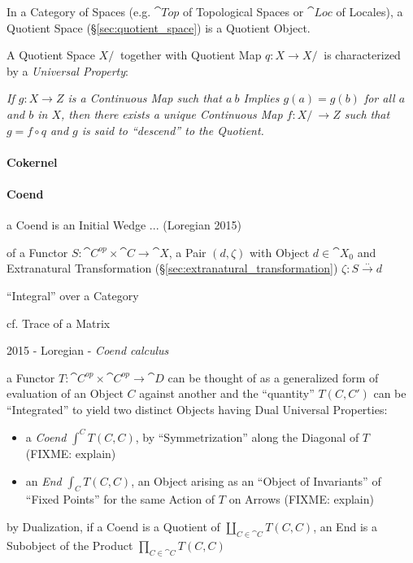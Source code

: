 In a Category of Spaces (e.g. $\cat{Top}$ of Topological Spaces or $\cat{Loc}$
of Locales), a Quotient Space (\S\ref{sec:quotient_space}) is a Quotient
Object.

A Quotient Space $X/~$ together with Quotient Map $q : X \rightarrow X/~$ is
characterized by a \emph{Universal Property}:

\emph{If $g : X \rightarrow Z$ is a Continuous Map such that $a ~ b$ Implies $g(a)
  = g(b)$ for all $a$ and $b$ in $X$, then there exists a unique Continuous Map
  $f : X/~ \rightarrow Z$ such that $g = f \circ q$ and $g$ is said to
  ``descend'' to the Quotient.}



\paragraph{Cokernel}\label{sec:cokernel}\hfill

\paragraph{Coend}\label{sec:coend}\hfill

a Coend is an Initial Wedge ... (Loregian 2015)

of a Functor $S : \cat{C}^{op} \times \cat{C} \rightarrow \cat{X}$, a Pair $(d,
\zeta)$ with Object $d \in \cat{X}_0$ and Extranatural Transformation
(\S\ref{sec:extranatural_transformation}) $\zeta : S \xrightarrow{..} d$

``Integral'' over a Category

cf. Trace of a Matrix

2015 - Loregian - \emph{Coend calculus}

a Functor $T : \cat{C}^{op} \times \cat{C}^{op} \rightarrow \cat{D}$ can be
thought of as a generalized form of evaluation of an Object $C$ against another
and the ``quantity'' $T(C,C')$ can be ``Integrated'' to yield two distinct
Objects having Dual Universal Properties:
\begin{itemize}
  \item a \emph{Coend} $\int^C T(C, C)$, by ``Symmetrization'' along the
    Diagonal of $T$ (FIXME: explain)
  \item an \emph{End} $\int_C T(C, C)$, an Object arising as an ``Object of
    Invariants'' of ``Fixed Points'' for the same Action of $T$ on Arrows
    (FIXME: explain)
\end{itemize}
by Dualization, if a Coend is a Quotient of $\coprod_{C\in\cat{C}}T(C, C)$, an
End is a Subobject of the Product $\prod_{C\in\cat{C}}T(C, C)$

